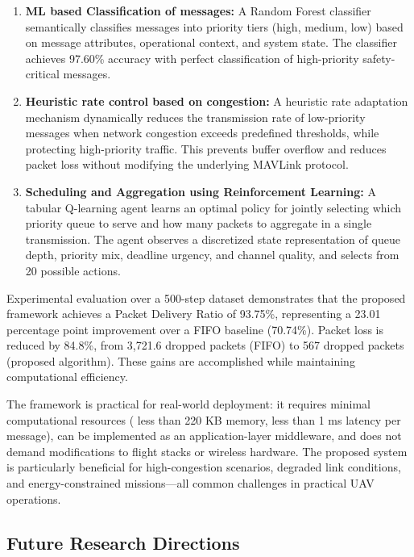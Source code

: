 \documentclass[pdflatex,sn-mathphys-num]{sn-jnl}%
\theoremstyle{thmstyleone}%
\theoremstyle{thmstyletwo}%
\theoremstyle{thmstylethree}%
\begin{document}
\begin{enumerate}
    \item \textbf{ML based Classification of messages:} A Random Forest classifier semantically classifies messages into priority tiers (high, medium, low) based on message attributes, operational context, and system state. The classifier achieves 97.60\% accuracy with perfect classification of high-priority safety-critical messages.
    
    \item \textbf{Heuristic rate control based on congestion:} A heuristic rate adaptation mechanism dynamically reduces the transmission rate of low-priority messages when network congestion exceeds predefined thresholds, while protecting high-priority traffic. This prevents buffer overflow and reduces packet loss without modifying the underlying MAVLink protocol.
    
    \item \textbf{Scheduling and Aggregation using Reinforcement Learning:} A tabular Q-learning agent learns an optimal policy for jointly selecting which priority queue to serve and how many packets to aggregate in a single transmission. The agent observes a discretized state representation of queue depth, priority mix, deadline urgency, and channel quality, and selects from 20 possible actions.
\end{enumerate}

Experimental evaluation over a 500-step dataset demonstrates that the proposed framework achieves a Packet Delivery Ratio of 93.75\%, representing a 23.01 percentage point improvement over a FIFO baseline (70.74\%). Packet loss is reduced by 84.8\%, from 3,721.6 dropped packets (FIFO) to 567 dropped packets (proposed algorithm). These gains are accomplished while maintaining computational efficiency.

The framework is practical for real-world deployment: it requires minimal computational resources ( less than 220 KB memory, less than 1 ms latency per message), can be implemented as an application-layer middleware, and does not demand modifications to flight stacks or wireless hardware. The proposed system is particularly beneficial for high-congestion scenarios, degraded link conditions, and energy-constrained missions—all common challenges in practical UAV operations.

\subsection{ Future Research Directions }
\end{document}
